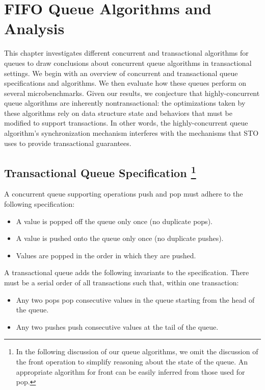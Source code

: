 \chapter{FIFO Queue Algorithms and Analysis}
\label{queue}

This chapter investigates different concurrent and transactional algorithms for queues to draw conclusions about concurrent queue algorithms in transactional settings. We begin with an overview of concurrent and transactional queue specifications and algorithms. We then evaluate how these queues perform on several microbenchmarks. Given our results, we conjecture that highly-concurrent queue algorithms are inherently nontransactional: the optimizations taken by these algorithms rely on data structure state and behaviors that must be modified to support transactions. In other words, the highly-concurrent queue algorithm's synchronization mechanism interferes with the mechanisms that STO uses to provide transactional guarantees.

\section[Transactional Queue Specification]{Transactional Queue Specification
\footnote{In the following discussion of our queue algorithms, we omit the discussion of the front operation to simplify reasoning about the state of the queue. An appropriate algorithm for front can be easily inferred from those used for pop.}}

A concurrent queue supporting operations push and pop must adhere to the following specification:
\begin{itemize}
    \item A value is popped off the queue only once (no duplicate pops).
    \item A value is pushed onto the queue only once (no duplicate pushes).
    \item Values are popped in the order in which they are pushed.
\end{itemize}

\noindent
A transactional queue adds the following invariants to the specification. There must be a serial order of all transactions such that, within one transaction:
\begin{itemize}
    \item Any two pops pop consecutive values in the queue starting from the head of the queue.
    \item Any two pushes push consecutive values at the tail of the queue.
\end{itemize}

